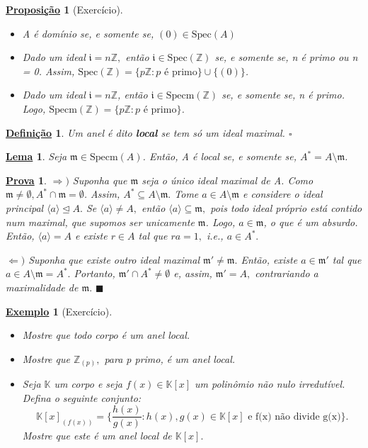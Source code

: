 \documentclass{article}
\newtheorem*{def*}{\underline{Defini\c c\~ao}}
\newtheorem*{lemma*}{\underline{Lema}}
\newtheorem*{prop*}{\underline{Proposi\c c\~ao}}
\newtheorem{example}{\underline{Exemplo}}
\newtheorem*{proof*}{\underline{Prova}}
\renewcommand\qedsymbol{$\blacksquare$}
\begin{document}
\begin{prop*}[Exercício]
 \begin{itemize}
  \item[1)] A é domínio se, e somente se, \((0)\in \mathrm{Spec}(A)\)
  \item[2)] Dado um ideal \(\mathfrak{i} = n \mathbb{Z},\) então \(\mathfrak{i}\in \mathrm{Spec}(\mathbb{Z})\) se, e somente se,
n é primo ou n = 0. Assim, \(\mathrm{Spec}(\mathbb{Z}) = \{p \mathbb{Z}: p \text{ é primo}\}\cup \{(0)\}\).
  \item[3)] Dado um ideal \(\mathfrak{i} = n \mathbb{Z}\), então \(\mathfrak{i}\in \mathrm{Specm}(\mathbb{Z})\) se, e somente se,
n é primo. Logo, \(\mathrm{Specm}(\mathbb{Z}) = \{p \mathbb{Z}:p \text{ é primo}\}\).
 \end{itemize}
\end{prop*}
\begin{def*}
  Um anel é dito \textbf{local} se tem só um ideal maximal. \(\square\)
\end{def*}
\begin{lemma*}
  Seja \(\mathfrak{m}\in \mathrm{Specm}(A)\). Então, A é local se, e somente se, \(A^{*} = A\setminus{\mathfrak{m}}\).
\end{lemma*}
\begin{proof*}
  \(\Rightarrow )\) Suponha que \(\mathfrak{m}\) seja o único ideal maximal de A. Como \(\mathfrak{m} \neq\emptyset, A^{*}\cap \mathfrak{m} = \emptyset\).
Assim, \(A^{*}\subseteq{A\setminus{\mathfrak{m}}}.\) Tome \(a\in A\setminus{\mathfrak{m}}\) e considere o ideal principal \(\langle a \rangle \trianglelefteq{A}.\)
Se \(\langle a \rangle\neq A,\) então \(\langle a \rangle \subseteq{\mathfrak{m}},\) pois todo ideal próprio está contido num maximal, que supomos ser unicamente \(\mathfrak{m}\).
Logo, \(a\in \mathfrak{m}\), o que é um absurdo. Então, \(\langle a \rangle = A\) e existe \(r\in A\) tal que \(ra = 1,\) i.e., \(a\in A^{*}.\)

  \(\Leftarrow )\) Suponha que existe outro ideal maximal \(\mathfrak{m}'\neq \mathfrak{m}.\) Então, existe \(a\in \mathfrak{m}'\)
tal que \(a\in A\setminus{\mathfrak{m}} = A^{*}.\) Portanto, \(\mathfrak{m}'\cap A^{*} \neq\emptyset\) e, assim, \(\mathfrak{m}' = A,\)
contrariando a maximalidade de \(\mathfrak{m}.\) \qedsymbol
\end{proof*}
\begin{example}[Exercício]
 \begin{itemize}
  \item[1)] Mostre que todo corpo é um anel local.
  \item[2)] Mostre que \(\mathbb{Z}_{(p)},\) para p primo, é um anel local.
  \item[3)] Seja \(\mathbb{K}\) um corpo e seja \(f(x)\in \mathbb{K}[x]\) um polinômio não nulo irredutível.
Defina o seguinte conjunto:
  \[
    \mathbb{K}[x]_{(f(x))} = \biggl\{\frac{h(x)}{g(x)}: h(x), g(x)\in \mathbb{K}[x] \text{ e f(x) não divide g(x)}\biggr\}.
  \]
  Mostre que este é um anel local de \(\mathbb{K}[x].\)
 \end{itemize}
\end{example}
\end{document}
